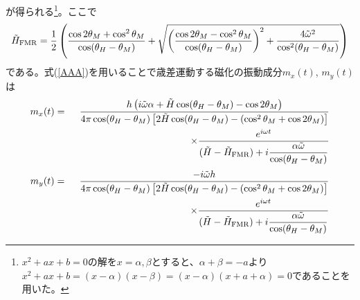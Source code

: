 が得られる\footnote{$x^2+ax+b=0$の解を$x=\alpha,\beta$とすると、$\alpha+\beta=-a$より$x^2+ax+b=(x-\alpha)(x-\beta)=(x-\alpha)(x+a+\alpha)=0$であることを用いた。}。ここで
\begin{equation}
\tilde H_{{\rm{FMR}}} =\frac{1}{2}\left(\frac{{\cos 2\theta_M  +\cos ^2 \theta_M }}{{\cos (\theta_H  - \theta_M )}} +\sqrt{\left(\frac{{\cos 2\theta_M  -\cos ^2 \theta_M }}{{\cos (\theta_H  - \theta_M )}}\right)^2+\frac{4{\tilde \omega ^2 }}{{\cos ^2 (\theta_H  - \theta_M )}}}\right)
\end{equation}
である。式(\ref{AAA})を用いることで歳差運動する磁化の振動成分$m_x(t)$, $m_y(t)$は
\begin{eqnarray}
m_x (t) &=& \frac{{h \left( {i\tilde \omega \alpha  + {\tilde H\cos (\theta_H  - \theta_M ) - \cos 2\theta_M } } \right)}}{{4\pi \cos (\theta_H  - \theta_M )\left[ {2\tilde H\cos (\theta_H  - \theta_M ) - \left( {\cos^ 2\theta_M  + \cos 2 \theta_M } \right)} \right]}}\nonumber\\
&&\hspace{12em} \times\frac{{e^{i\omega t} }}{{{\rm{ }}(\tilde H - \tilde H_{{\rm{FMR}}} ) + i\dfrac{{\alpha \tilde \omega }}{{\cos (\theta_H  - \theta_M )}}}} \label{mmx}
\end{eqnarray}
\begin{eqnarray}
m_y (t)  &=& \frac{{ - i\tilde \omega h }}{{4\pi \cos (\theta_H  - \theta_M )\left[ {2\tilde H\cos (\theta_H  - \theta_M ) - \left( {\cos^ 2\theta_M  + \cos 2 \theta_M} \right)} \right]}}\nonumber\\
&&\hspace{12em} \times\frac{{e^{i\omega t} }}{{{\rm{ }}(\tilde H - \tilde H_{{\rm{FMR}}} ) + i\dfrac{{\alpha \tilde \omega }}{{\cos (\theta_H  - \theta_M )}}}} \label{mmy}
\end{eqnarray}
